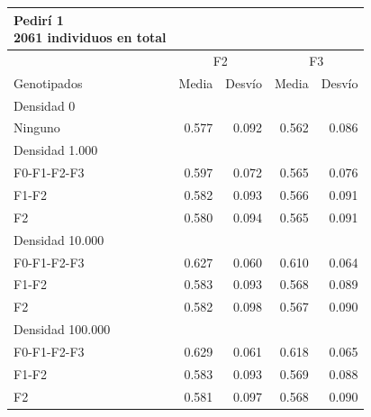 \documentclass[11pt,spanish,a4paper,oneside,]{book} %
\begin{document}
\captionsetup[table]{labelformat=empty,skip=1pt}
\begin{longtable}{lrrrr}
\caption*{
{\large Pedirí 1} \\ 
{\small 2061 individuos en total}
} \\ 
\toprule
 & \multicolumn{2}{c}{F2} & \multicolumn{2}{c}{F3} \\ 
 \cmidrule(lr){2-3} \cmidrule(lr){4-5}
Genotipados & Media & Desvío & Media & Desvío \\ 
\midrule
\multicolumn{1}{l}{Densidad 0} \\ 
\midrule
Ninguno & 0.577 & 0.092 & 0.562 & 0.086 \\ 
\midrule
\multicolumn{1}{l}{Densidad 1.000} \\ 
\midrule
F0-F1-F2-F3 & 0.597 & 0.072 & 0.565 & 0.076 \\ 
F1-F2 & 0.582 & 0.093 & 0.566 & 0.091 \\ 
F2 & 0.580 & 0.094 & 0.565 & 0.091 \\ 
\midrule
\multicolumn{1}{l}{Densidad 10.000} \\ 
\midrule
F0-F1-F2-F3 & 0.627 & 0.060 & 0.610 & 0.064 \\ 
F1-F2 & 0.583 & 0.093 & 0.568 & 0.089 \\ 
F2 & 0.582 & 0.098 & 0.567 & 0.090 \\ 
\midrule
\multicolumn{1}{l}{Densidad 100.000} \\ 
\midrule
F0-F1-F2-F3 & 0.629 & 0.061 & 0.618 & 0.065 \\ 
F1-F2 & 0.583 & 0.093 & 0.569 & 0.088 \\ 
F2 & 0.581 & 0.097 & 0.568 & 0.090 \\ 
 \bottomrule
\end{longtable}
\captionsetup[table]{labelformat=empty,skip=1pt}
\end{document}
